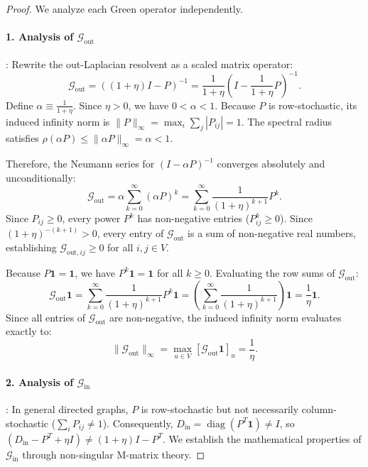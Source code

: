 \documentclass[11pt,a4paper]{article}
\begin{document}
\begin{proof}
We analyze each Green operator independently.

\paragraph{1. Analysis of $\mathcal{G}_{\text{out}}$}:
Rewrite the out-Laplacian resolvent as a scaled matrix operator:
\begin{equation}
\mathcal{G}_{\text{out}} = \left( (1 + \eta) I - P \right)^{-1} = \frac{1}{1 + \eta} \left( I - \frac{1}{1 + \eta} P \right)^{-1}.
\end{equation}
Define $\alpha \equiv \frac{1}{1 + \eta}$. Since $\eta > 0$, we have $0 < \alpha < 1$. Because $P$ is row-stochastic, its induced infinity norm is $\|P\|_\infty = \max_i \sum_j |P_{ij}| = 1$. The spectral radius satisfies $\rho(\alpha P) \le \|\alpha P\|_\infty = \alpha < 1$.

Therefore, the Neumann series for $(I - \alpha P)^{-1}$ converges absolutely and unconditionally:
\begin{equation}
\mathcal{G}_{\text{out}} = \alpha \sum_{k=0}^\infty (\alpha P)^k = \sum_{k=0}^\infty \frac{1}{(1 + \eta)^{k+1}} P^k.
\end{equation}
Since $P_{ij} \ge 0$, every power $P^k$ has non-negative entries ($P^k_{ij} \ge 0$). Since $(1+\eta)^{-(k+1)} > 0$, every entry of $\mathcal{G}_{\text{out}}$ is a sum of non-negative real numbers, establishing $\mathcal{G}_{\text{out}, ij} \ge 0$ for all $i, j \in V$.

Because $P \mathbf{1} = \mathbf{1}$, we have $P^k \mathbf{1} = \mathbf{1}$ for all $k \ge 0$. Evaluating the row sums of $\mathcal{G}_{\text{out}}$:
\begin{equation}
\mathcal{G}_{\text{out}} \mathbf{1} = \sum_{k=0}^\infty \frac{1}{(1 + \eta)^{k+1}} P^k \mathbf{1} = \left( \sum_{k=0}^\infty \frac{1}{(1 + \eta)^{k+1}} \right) \mathbf{1} = \frac{1}{\eta} \mathbf{1}.
\end{equation}
Since all entries of $\mathcal{G}_{\text{out}}$ are non-negative, the induced infinity norm evaluates exactly to:
\begin{equation}
\|\mathcal{G}_{\text{out}}\|_\infty = \max_{u \in V} [\mathcal{G}_{\text{out}} \mathbf{1}]_u = \frac{1}{\eta}.
\end{equation}

\paragraph{2. Analysis of $\mathcal{G}_{\text{in}}$}:
In general directed graphs, $P$ is row-stochastic but not necessarily column-stochastic ($\sum_i P_{ij} \ne 1$). Consequently, $D_{\text{in}} = \operatorname{diag}(P^T \mathbf{1}) \ne I$, so $(D_{\text{in}} - P^T + \eta I) \ne (1+\eta)I - P^T$. We establish the mathematical properties of $\mathcal{G}_{\text{in}}$ through non-singular M-matrix theory.


\end{proof}
\end{document}
